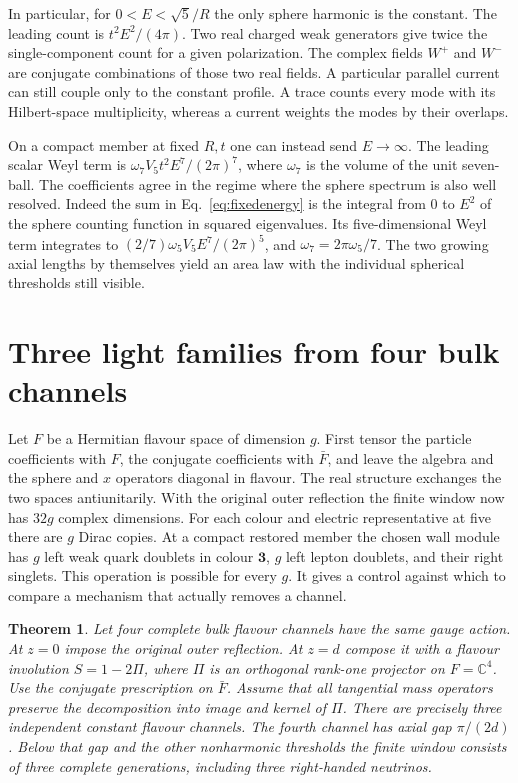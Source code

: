 \documentclass[aps,prd,reprint,onecolumn,nofootinbib,amsmath,amssymb]{revtex4-2}
\newtheorem{theorem}{Theorem}
\begin{document}
In particular, for $0<E<\sqrt5/R$ the only sphere harmonic is the constant. The leading count is $t^2E^2/(4\pi)$. Two real charged weak generators give twice the single-component count for a given polarization. The complex fields $W^+$ and $W^-$ are conjugate combinations of those two real fields. A particular parallel current can still couple only to the constant profile. A trace counts every mode with its Hilbert-space multiplicity, whereas a current weights the modes by their overlaps.

On a compact member at fixed $R,t$ one can instead send $E\to\infty$. The leading scalar Weyl term is $\omega_7 V_5t^2 E^7/(2\pi)^7$, where $\omega_7$ is the volume of the unit seven-ball. The coefficients agree in the regime where the sphere spectrum is also well resolved. Indeed the sum in Eq.~\eqref{eq:fixedenergy} is the integral from $0$ to $E^2$ of the sphere counting function in squared eigenvalues. Its five-dimensional Weyl term integrates to $(2/7)\omega_5 V_5E^7/(2\pi)^5$, and $\omega_7=2\pi\omega_5/7$. The two growing axial lengths by themselves yield an area law with the individual spherical thresholds still visible.

\section{Three light families from four bulk channels}
Let $F$ be a Hermitian flavour space of dimension $g$. First tensor the particle coefficients with $F$, the conjugate coefficients with $\bar F$, and leave the algebra and the sphere and $x$ operators diagonal in flavour. The real structure exchanges the two spaces antiunitarily. With the original outer reflection the finite window now has $32g$ complex dimensions. For each colour and electric representative at five there are $g$ Dirac copies. At a compact restored member the chosen wall module has $g$ left weak quark doublets in colour $\mathbf3$, $g$ left lepton doublets, and their right singlets. This operation is possible for every $g$. It gives a control against which to compare a mechanism that actually removes a channel.

\begin{theorem}
Let four complete bulk flavour channels have the same gauge action. At $z=0$ impose the original outer reflection. At $z=d$ compose it with a flavour involution $S=1-2\Pi$, where $\Pi$ is an orthogonal rank-one projector on $F=\mathbb C^4$. Use the conjugate prescription on $\bar F$. Assume that all tangential mass operators preserve the decomposition into image and kernel of $\Pi$. There are precisely three independent constant flavour channels. The fourth channel has axial gap $\pi/(2d)$. Below that gap and the other nonharmonic thresholds the finite window consists of three complete generations, including three right-handed neutrinos.
\end{theorem}
\end{document}
